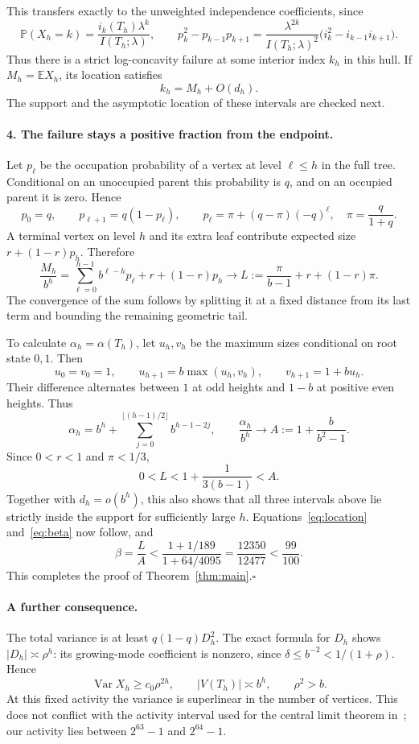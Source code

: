 \documentclass[11pt]{article}
\newcommand{\Var}{\operatorname{Var}}
\newcommand{\E}{\mathbb E}
\newcommand{\Prob}{\mathbb P}
\begin{document}
This transfers exactly to the unweighted independence coefficients, since
\begin{equation}\label{eq:tilt}
 \Prob(X_h=k)=\frac{i_k(T_h)\lambda^k}{I(T_h;\lambda)},\qquad
 p_k^2-p_{k-1}p_{k+1}
 =\frac{\lambda^{2k}}{I(T_h;\lambda)^2}
   \big(i_k^2-i_{k-1}i_{k+1}\big).
\end{equation}
Thus there is a strict log-concavity failure at some interior index $k_h$ in this hull. If $M_h=\E X_h$, its location satisfies
\begin{equation}\label{eq:location}
 k_h=M_h+O(d_h).
\end{equation}
The support and the asymptotic location of these intervals are checked next.

\paragraph{4. The failure stays a positive fraction from the endpoint.}
Let $p_\ell$ be the occupation probability of a vertex at level $\ell\le h$ in the full tree. Conditional on an unoccupied parent this probability is $q$, and on an occupied parent it is zero. Hence
\[
 p_0=q,\qquad p_{\ell+1}=q(1-p_\ell),\qquad
 p_\ell=\pi+(q-\pi)(-q)^\ell,\quad \pi=\frac q{1+q}.
\]
A terminal vertex on level $h$ and its extra leaf contribute expected size
$r+(1-r)p_h$. Therefore
\[
 \frac{M_h}{b^h}
 =\sum_{\ell=0}^{h-1}b^{\ell-h}p_\ell+r+(1-r)p_h
 \longrightarrow L:=\frac{\pi}{b-1}+r+(1-r)\pi.
\]
The convergence of the sum follows by splitting it at a fixed distance from its last term and bounding the remaining geometric tail.

To calculate $\alpha_h=\alpha(T_h)$, let $u_h,v_h$ be the maximum sizes conditional on root state $0,1$. Then
\[
 u_0=v_0=1,\qquad u_{h+1}=b\max(u_h,v_h),\qquad v_{h+1}=1+bu_h.
\]
Their difference alternates between $1$ at odd heights and $1-b$ at positive even heights. Thus
\[
 \alpha_h=b^h+\sum_{j=0}^{\lfloor(h-1)/2\rfloor}b^{h-1-2j},
 \qquad \frac{\alpha_h}{b^h}\longrightarrow A:=1+\frac b{b^2-1}.
\]
Since $0<r<1$ and $\pi<1/3$,
\[
 0<L<1+\frac1{3(b-1)}<A.
\]
Together with $d_h=o(b^h)$, this also shows that all three intervals above lie strictly inside the support for sufficiently large $h$. Equations~\eqref{eq:location} and~\eqref{eq:beta} now follow, and
\[
 \beta=\frac LA<\frac{1+1/189}{1+64/4095}
 =\frac{12350}{12477}<\frac{99}{100}.
\]
This completes the proof of Theorem~\ref{thm:main}.\hfill$\square$

\paragraph{A further consequence.}
The total variance is at least $q(1-q)D_h^2$. The exact formula for $D_h$ shows $|D_h|\asymp\rho^h$: its growing-mode coefficient is nonzero, since $\delta\le b^{-2}<1/(1+\rho)$. Hence
\[
 \Var X_h\ge c_0\rho^{2h},\qquad |V(T_h)|\asymp b^h,
 \qquad \rho^2>b.
\]
At this fixed activity the variance is superlinear in the number of vertices. This does not conflict with the activity interval used for the central limit theorem in~\cite{Fang}; our activity lies between $2^{63}-1$ and $2^{64}-1$.
\end{document}
